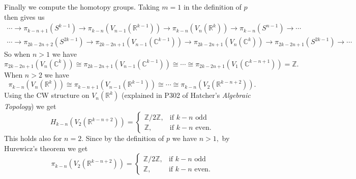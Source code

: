 \documentclass{article}
\begin{document}
Finally we compute the homotopy groups. Taking $m=1$ in the definition of $p$ then gives us
\begin{gather}
\cdots\rightarrow \pi_{k-n+1}(S^{k-1})\rightarrow \pi_{k-n}(V_{n-1}(\mathbb{R}^{k-1}))\rightarrow \pi_{k-n}(V_n(\mathbb{R}^k))\rightarrow \pi_{k-n}(S^{n-1})\rightarrow\cdots \label{les3}\\
\cdots\rightarrow \pi_{2k-2n+2}(S^{2k-1})\rightarrow \pi_{2k-2n+1}(V_{n-1}(\mathbb{C}^{k-1}))\rightarrow \pi_{2k-2n+1}(V_{n}(\mathbb{C}^k))\rightarrow \pi_{2k-2n+1}(S^{2k-1})\rightarrow\cdots \label{les4}
\end{gather}
So when $n>1$ we have
\[\pi_{2k-2n+1}(V_{n}(\mathbb{C}^k))\cong\pi_{2k-2n+1}(V_{n-1}(\mathbb{C}^{k-1}))\cong\cdots\cong\pi_{2k-2n+1}(V_{1}(\mathbb{C}^{k-n+1}))=\mathbb{Z}.\]
When $n>2$ we have
\[\pi_{k-n}(V_{n}(\mathbb{R}^k))\cong\pi_{k-n+1}(V_{n-1}(\mathbb{R}^{k-1}))\cong\cdots\cong\pi_{k-n}(V_{2}(\mathbb{R}^{k-n+2})).\]
Using the CW structure on $V_n(\mathbb{R}^k)$ (explained in P302 of Hatcher's \textit{Algebraic Topology}) we get
\[H_{k-n}(V_{2}(\mathbb{R}^{k-n+2}))=
\begin{cases}
  \mathbb{Z}/2\mathbb{Z}, & \mbox{if } k-n\text{ odd} \\
  \mathbb{Z}, & \mbox{if } k-n\text{ even}.
\end{cases}\]
This holds also for $n=2.$ Since by the definition of $p$ we have $n>1,$ by Hurewicz's theorem we get
\[\pi_{k-n}(V_{2}(\mathbb{R}^{k-n+2}))=
\begin{cases}
  \mathbb{Z}/2\mathbb{Z}, & \mbox{if } k-n\text{ odd} \\
  \mathbb{Z}, & \mbox{if } k-n\text{ even}.
\end{cases}\]
\end{document}
